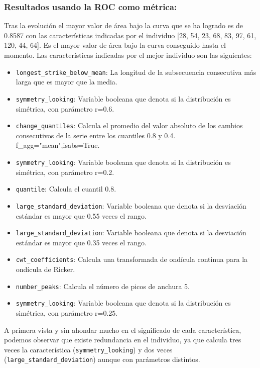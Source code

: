 \documentclass[a4paper,12pt,twoside,oldfontcommands]{memoir}
\begin{document}
\subsubsection{Resultados usando la ROC como métrica:} 

Tras la evolución el mayor valor de área bajo la curva que se ha logrado es de 0.8587 con las características indicadas por el individuo [28, 54, 23, 68, 83, 97, 61, 120, 44, 64]. Es el mayor valor de área bajo la curva conseguido hasta el momento. Las características indicadas por el mejor individuo son las siguientes: 
\begin{itemize}
    \item \texttt{longest\_strike\_below\_mean}: La longitud de la subsecuencia consecutiva más larga que es mayor que la media. 
    \item \texttt{symmetry\_looking}: Variable booleana que denota si la distribución es simétrica, con parámetro r=0.6. 
    \item \texttt{change\_quantiles}: Calcula el promedio del valor absoluto de los cambios consecutivos de la serie entre los cuantiles 0.8 y 0.4. f\_agg="mean",isabs=True.
    \item \texttt{symmetry\_looking}: Variable booleana que denota si la distribución es simétrica, con parámetro r=0.2.
    \item \texttt{quantile}: Calcula el cuantil 0.8. 
    \item \texttt{large\_standard\_deviation}: Variable booleana que denota si la desviación estándar es mayor que 0.55 veces el rango.
    \item \texttt{large\_standard\_deviation}: Variable booleana que denota si la desviación estándar es mayor que 0.35 veces el rango. 
    \item \texttt{cwt\_coefficients}: Calcula una transformada de ondícula continua para la ondícula de Ricker. 
    \item \texttt{number\_peaks}: Calcula el número de picos de anchura 5. 
    \item \texttt{symmetry\_looking}: Variable booleana que denota si la distribución es simétrica, con parámetro r=0.25.
\end{itemize}

A primera vista y sin ahondar mucho en el significado de cada característica, podemos observar que existe redundancia en el individuo, ya que calcula tres veces la característica (\texttt{symmetry\_looking}) y dos veces (\texttt{large\_standard\_deviation}) aunque con parámetros distintos. 
\end{document}
